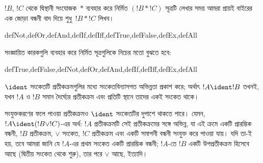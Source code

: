\documentclass[../../../include/open-logic-section]{subfiles}
\begin{document}
$!B$, $!C$ থেকে দ্বিস্থানী সংযোজক~$\ast$ ব্যবহার করে নির্মিত
$(!B \ast !C)$ সূত্রটি লেখার সময় আমরা প্রায়ই বাইরের এক জোড়া বন্ধনী
বাদ দিয়ে শুধু~$!B \ast !C$ লিখব।

\begin{tagblock}{defNot,defOr,defAnd,defIf,defIff,defTrue,defFalse,defEx,defAll}
\begin{defn}
সংজ্ঞায়িত কারকগুলি ব্যবহার করে নির্মিত সূত্রগুলিকে নিচের মতো বুঝতে হবে:

\begin{tagenumerate}{defTrue,defFalse,defNot,defOr,defAnd,defIf,defIff,defEx,defAll}







\end{tagenumerate}
\end{defn}
\end{tagblock}

\begin{defn}[সংকেতবিন্যাসগত অভিন্নতা]
$\ident$ সংকেতটি প্রতীকক্রমগুলির মধ্যে সংকেতবিন্যাসগত অভিন্নতা প্রকাশ করে;
অর্থাৎ $!A \ident !B$ তখনই, যখন $!A$ ও $!B$ সমান দৈর্ঘ্যের প্রতীকক্রম এবং
প্রতিটি স্থানে তাদের একই সংকেত থাকে।
\end{defn}

সংযুক্তকরণের ফলে পাওয়া প্রতীকক্রমও $\ident$ সংকেতটির দুপাশে থাকতে পারে।
যেমন, $!A \ident (!B \lor !C)$-এর অর্থ: $!A$ প্রতীকক্রমটি সেই প্রতীকক্রমের
সঙ্গে অভিন্ন, যা এই ক্রমে একটি প্রারম্ভিক বন্ধনী, $!B$ প্রতীকক্রম,
$\lor$ সংকেত, $!C$ প্রতীকক্রম এবং একটি সমাপনী বন্ধনী সংযুক্ত করে পাওয়া
যায়। যদি তা-ই হয়, তবে আমরা জানি যে $!A$-এর প্রথম সংকেত একটি প্রারম্ভিক
বন্ধনী; $!A$-তে $!B$ একটি উপপ্রতীকক্রম হিসেবে আছে (দ্বিতীয় সংকেত থেকে
শুরু), তার পরে $\lor$ আছে, ইত্যাদি।
\end{document}
